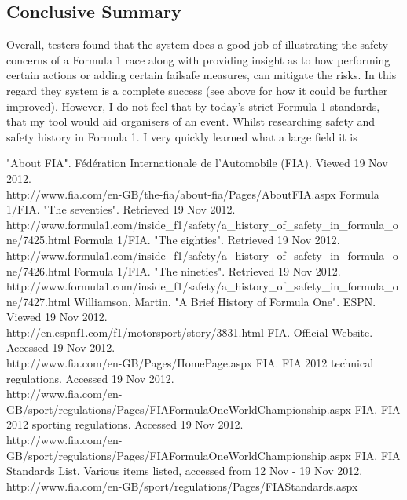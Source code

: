 \documentclass[12pt]{article} %
\begin{document}
\subsection{Conclusive Summary}
Overall, testers found that the system does a good job of illustrating the safety concerns of a Formula 1 race along with providing insight as to how performing certain actions or adding certain failsafe measures, can mitigate the risks. In this regard they system is a complete success (see above for how it could be further improved). However, I do not feel that by today's strict Formula 1 standards, that my tool would aid organisers of an event. Whilst researching safety and safety history in Formula 1. I very quickly learned what a large field it is
\newpage
\begin{thebibliography}{99} %

\bibitem
\newblock "About FIA". Fédération Internationale de l'Automobile (FIA). Viewed 19 Nov 2012.\\ http://www.fia.com/en-GB/the-fia/about-fia/Pages/AboutFIA.aspx
\bibitem
\newblock  Formula 1/FIA. "The seventies". Retrieved 19 Nov 2012.\\ http://www.formula1.com/inside\_f1/safety/a\_history\_of\_safety\_in\_formula\_one/7425.html
\bibitem
\newblock  Formula 1/FIA. "The eighties". Retrieved 19 Nov 2012.\\ http://www.formula1.com/inside\_f1/safety/a\_history\_of\_safety\_in\_formula\_one/7426.html
\bibitem
\newblock  Formula 1/FIA. "The nineties". Retrieved 19 Nov 2012. \\http://www.formula1.com/inside\_f1/safety/a\_history\_of\_safety\_in\_formula\_one/7427.html
\bibitem
\newblock Williamson, Martin. "A Brief History of Formula One". ESPN. Viewed 19 Nov 2012. \\http://en.espnf1.com/f1/motorsport/story/3831.html
\bibitem
\newblock FIA. Official Website. Accessed 19 Nov 2012.\\ http://www.fia.com/en-GB/Pages/HomePage.aspx
\bibitem 
\newblock FIA. FIA 2012 technical regulations. Accessed 19 Nov 2012.\\ http://www.fia.com/en-GB/sport/regulations/Pages/FIAFormulaOneWorldChampionship.aspx
\bibitem 
\newblock FIA. FIA 2012 sporting regulations. Accessed 19 Nov 2012.\\ http://www.fia.com/en-GB/sport/regulations/Pages/FIAFormulaOneWorldChampionship.aspx
\bibitem
\newblock FIA. FIA Standards List. Various items listed, accessed from 12 Nov - 19 Nov 2012.\\ http://www.fia.com/en-GB/sport/regulations/Pages/FIAStandards.aspx
 

\end{thebibliography}
\newpage
\appendix
\end{document}
